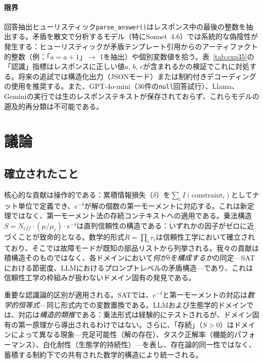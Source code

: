\documentclass[11pt,a4paper]{article}
\begin{document}
\paragraph{限界}
\label{sec:exp35-limitations}
回答抽出ヒューリスティック\texttt{parse\_answer()}はレスポンス中の最後の整数を抽出する。矛盾を散文で分析するモデル（特にSonnet~4.6）では系統的な偽陰性が発生する：ヒューリスティックが矛盾テンプレート引用からのアーティファクト的整数（例：「$a = a + 1$」$\to$ 1を抽出）や個別変数値を拾う。表~\ref{tab:exp35}の「認識」指標はレスポンスに正しい値$a$, $b$, $c$が含まれるかの検証でこれに対処する。将来の追試では構造化出力（JSONモード）または制約付きデコーディングの使用を推奨する。また、GPT-4o-mini（36件の\texttt{null}回答試行）、Llama、Geminiの実行では生のレスポンステキストが保存されておらず、これらモデルの遡及的再分類は不可能である。

\section{議論}
\label{sec:discussion}

\subsection{確立されたこと}

核心的な貢献は操作的である：累積情報損失（$\delta$）を$\sum_i I(\text{constraint}_i)$としてナット単位で定義でき、$e^{-\delta}$が解の個数の第一モーメントに対応する。これは新定理ではなく、第一モーメント法\cite{alon2016}の存続コンテキストへの適用である。乗法構造$S = N_{eff} \cdot (\mu/\mu_c) \cdot e^{-\delta}$は直列信頼性の構造である：いずれかの因子がゼロに近づくことが致命的となる。数学的形式$R = \prod_i r_i$は信頼性工学において確立されており\cite{barlow1975}、そこでは故障モードが既知の部品リストから列挙される。我々の貢献は積構造そのものではなく、各ドメインにおいて\emph{何が$\delta$を構成するか}の同定---SATにおける節密度、LLMにおけるプロンプトレベルの矛盾構造---であり、これは信頼性工学の枠組みが扱わないドメイン固有の発見である。

重要な認識論的区別が適用される。SATでは、$e^{-\delta}$と第一モーメントの対応は\emph{数学的恒等式}---同じ形式内での変数置換である。LLMおよび生態学的ドメインでは、対応は\emph{構造的類推}である：乗法形式は経験的にテストされるが、ドメイン固有の第一原理から導出されるわけではない。さらに、「存続」（$S > 0$）はドメインによって異なる現象---充足可能性（解の存在）、タスク正解率（機能的パフォーマンス）、白化耐性（生態学的持続性）---を表し、存在論的同一性ではなく、蓄積する制約下での共有された数学的構造により統一される。
\end{document}
